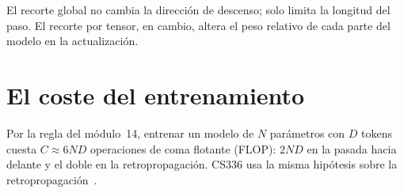 El recorte global no cambia la dirección de descenso; solo limita la longitud del paso. El recorte por tensor, en cambio, altera el peso relativo de cada parte del modelo en la actualización.

\section{El coste del entrenamiento}

Por la regla del módulo~14, entrenar un modelo de $N$ parámetros con $D$ tokens cuesta $C\approx 6ND$ operaciones de coma flotante (FLOP): $2ND$ en la pasada hacia delante y el doble en la retropropagación. CS336 usa la misma hipótesis sobre la retropropagación~\cite[§4.3, problema \emph{adamw\_accounting}]{cs336}.

\addtocounter{definicion}{1}%

